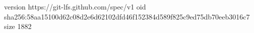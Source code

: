 version https://git-lfs.github.com/spec/v1
oid sha256:58aa15100d62c08d2e6d62102dfd46f152384d589f825c9ed75db70eeb3016c7
size 1882
